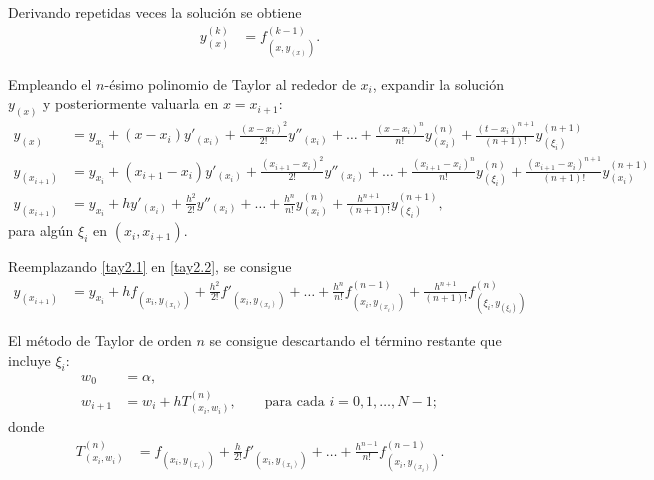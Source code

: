 \documentclass[
    english, spanish, Ce-table, Ce-theorem
]{CabesHW}
\begin{document}
Derivando repetidas veces la solución se obtiene
\begin{align*}
\label{tay2.1}
    y^{(k)}_{(x)} &= f^{(k-1)}_{(x, y_{(x)})}. \tag{2.1}
\end{align*}

Empleando el $n$-ésimo polinomio de Taylor al rededor de $x_i$, expandir la solución $y_{(x)}$ y posteriormente valuarla en $x= x_{i+1}$:
\begin{align*}
    y_{(x)} &= y_{x_i} + (x-x_i)y'_{(x_i)} + \frac{(x-x_i)^2}{2!}y''_{(x_i)} + \ldots + \frac{(x-x_i)^{n}}{n!}y^{(n)}_{(x_i)} + \frac{(t-x_i)^{n+1}}{(n+1)!}y^{(n+1)}_{(\xi_i)}\\
    y_{(x_{i+1})} &= y_{x_i} + (x_{i+1}-x_i)y'_{(x_i)} + \frac{(x_{i+1}-x_i)^2}{2!}y''_{(x_i)} + \ldots + \frac{(x_{i+1}-x_i)^{n}}{n!}y^{(n)}_{(\xi_i)} + \frac{(x_{i+1}-x_i)^{n+1}}{(n+1)!}y^{(n+1)}_{(x_i)}\\
\label{tay2.2}
    y_{(x_{i+1})} &= y_{x_i} + hy'_{(x_i)} + \frac{h^2}{2!}y''_{(x_i)} + \ldots + \frac{h^{n}}{n!}y^{(n)}_{(x_i)} + \frac{h^{n+1}}{(n+1)!}y^{(n+1)}_{(\xi_i)}, \tag{2.2}
\end{align*}
para algún $\xi_i$ en $(x_i, x_{i+1})$.

Reemplazando \eqref{tay2.1} en \eqref{tay2.2}, se consigue
\begin{align*}
    y_{(x_{i+1})} &= y_{x_i} + hf_{(x_i, y_{(x_i)})} + \frac{h^2}{2!}f'_{(x_i, y_{(x_i)})} + \ldots + \frac{h^{n}}{n!}f^{(n-1)}_{(x_i, y_{(x_i)})} + \frac{h^{n+1}}{(n+1)!}f^{(n)}_{(\xi_i, y_{(\xi_i)})}
\end{align*}

El método de Taylor de orden $n$ se consigue descartando el término restante que incluye $\xi_i$:
\begin{align*}
    w_0 &= \alpha,\\
    w_{i+1} &= w_i + hT^{(n)}_{(x_i, w_i)}, \qquad \text{para cada $i = 0, 1, \ldots, N-1$};
\end{align*}
donde
\begin{align*}
    T^{(n)}_{(x_i, w_i)} &= f_{(x_i, y_{(x_i)})} + \frac{h}{2!}f'_{(x_i, y_{(x_i)})} + \ldots + \frac{h^{n-1}}{n!}f^{(n-1)}_{(x_i, y_{(x_i)})} .
\end{align*}
\end{document}
